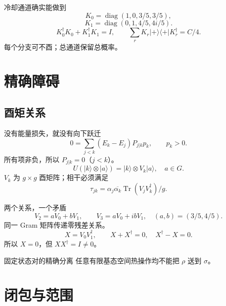 \documentclass{beamer}
\begin{document}
\begin{frame}{冷却通道确实能做到}
\[K_0=\operatorname{diag}(1,0,3/5,3/5),\]
 \[K_1=\operatorname{diag}(0,1,4/5,4i/5).\]
 \[K_0^\dagger K_0+K_1^\dagger K_1=I,\qquad
 \sum_r K_r|+\rangle\langle+|K_r^\dagger=C/4.\]
 每个分支可不酉；总通道保留总概率。
\end{frame}
\section{精确障碍}
\subsection{酉矩关系}
\begin{frame}{没有能量损失，就没有向下跃迁}
\[0=\sum_{j<k}(E_k-E_j)P_{j|k}p_k,\qquad p_k>0.\]
 所有项非负，所以 $P_{j|k}=0$（$j<k$）。
 \[U(|k\rangle\otimes|a\rangle)=|k\rangle\otimes V_k|a\rangle,\quad a\in G.\]
 $V_k$ 为 $g\times g$ 酉矩阵；相干必须满足
 \[\tau_{jk}=\alpha_j\overline{\alpha_k}\operatorname{Tr}(V_jV_k^\dagger)/g.\]
\end{frame}
\begin{frame}{两个关系，一个矛盾}
\[V_2=aV_0+bV_1,\qquad V_3=aV_0+ibV_1,\quad(a,b)=(3/5,4/5).\]
 同一 Gram 矩阵传递零残差关系。
 \[X=V_0V_1^\dagger,\qquad X+X^\dagger=0,\quad X^\dagger-X=0.\]
 所以 $X=0$，但 $XX^\dagger=I\ne0$。
 \begin{block}{固定状态对的精确分离}
 任意有限基态空间热操作均不能把 $\rho$ 送到 $\sigma$。
 \end{block}
\end{frame}
\section{闭包与范围}
\end{document}
